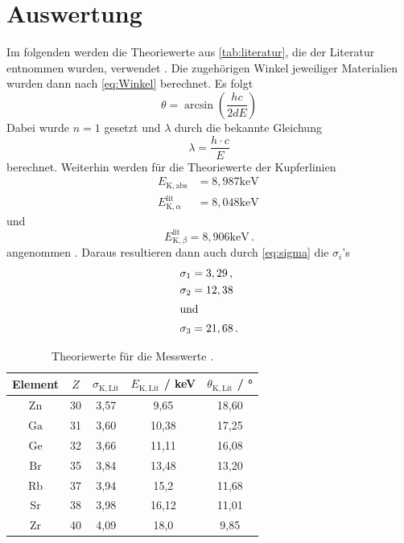 \section{Auswertung}
\label{sec:Auswertung}


Im folgenden werden die Theoriewerte aus \autoref{tab:literatur}, die der Literatur entnommen wurden, verwendet \cite{x_ray_database}.
Die zugehörigen Winkel jeweiliger Materialien wurden dann nach \autoref{eq:Winkel} berechnet.
Es folgt 
\begin{equation*}
  \theta = \arcsin \left( \frac{h c}{2 d E} \right)
\end{equation*}
Dabei wurde $n = 1$ gesetzt und $\lambda$ durch die bekannte Gleichung 
\begin{equation*}
  \lambda = \frac{h \cdot c}{E}
\end{equation*}
berechnet.
Weiterhin werden für die Theoriewerte der Kupferlinien
\begin{align*}
  E_{\mathrm{K}, \mathrm{abs}} &=8,987 \mathrm{keV} \, \\
  E_{\mathrm{K}, \alpha}^{\mathrm{lit}} &=8,048 \mathrm{keV} 
\end{align*}
und
\begin{equation*}
  E_{\mathrm{K}, \beta}^{\mathrm{lit}} =8,906 \mathrm{keV} \, .
\end{equation*}
angenommen \cite{x_ray_database}.
Daraus resultieren dann auch durch \autoref{eq:sigma} die $\sigma_i$'s
\begin{align*}
  \sigma_{1} &=3,29 \, ,\\
  \sigma_{2} &=12,38 \\ 
  \intertext{und}
  \sigma_{3} &=21,68 \, .
\end{align*}
 
\begin{table}
  \centering
  \caption{Theoriewerte für die Messwerte \cite{x_ray_database}.}
  \label{tab:literatur}
  \begin{tabular}{ccccc} 
    \hline Element & $Z$ & $\sigma_{\mathrm{K, Lit}}$& $E_{\mathrm{K, Lit}}$ / keV & $\theta_{\mathrm{K, Lit}}$ / ° \\
    \hline 
    $\mathrm{Zn}$ & 30 & 3,57 & 9,65   & 18,60  \\
    $\mathrm{Ga}$ & 31 & 3,60 & 10,38  & 17,25  \\
    $\mathrm{Ge}$ & 32 & 3,66 & 11,11  & 16,08  \\
    $\mathrm{Br}$ & 35 & 3,84 & 13,48  & 13,20  \\
    $\mathrm{Rb}$ & 37 & 3,94 & 15,2   & 11,68   \\
    $\mathrm{Sr}$ & 38 & 3,98 & 16,12  & 11,01  \\
    $\mathrm{Zr}$ & 40 & 4,09 & 18,0   & 9,85    \\
    \hline
  \end{tabular}
\end{table}

